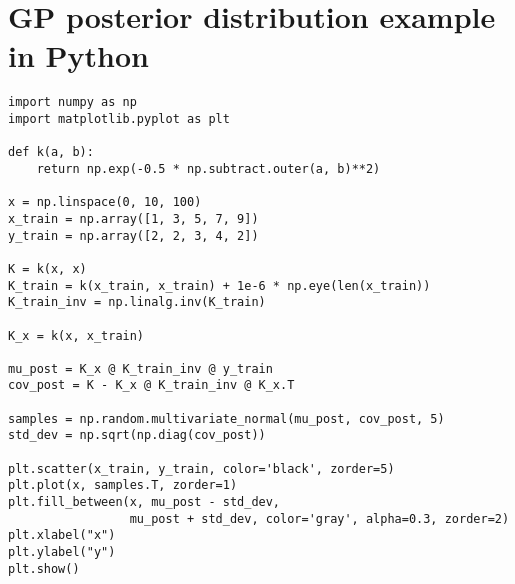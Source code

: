 \chapter{GP posterior distribution example in Python}
\label{att:gp-post-graph}
\begin{Verbatim}[tabsize=4]
import numpy as np
import matplotlib.pyplot as plt

def k(a, b):
	return np.exp(-0.5 * np.subtract.outer(a, b)**2)

x = np.linspace(0, 10, 100)
x_train = np.array([1, 3, 5, 7, 9])
y_train = np.array([2, 2, 3, 4, 2])

K = k(x, x)
K_train = k(x_train, x_train) + 1e-6 * np.eye(len(x_train))
K_train_inv = np.linalg.inv(K_train)

K_x = k(x, x_train)

mu_post = K_x @ K_train_inv @ y_train
cov_post = K - K_x @ K_train_inv @ K_x.T

samples = np.random.multivariate_normal(mu_post, cov_post, 5)
std_dev = np.sqrt(np.diag(cov_post))

plt.scatter(x_train, y_train, color='black', zorder=5)
plt.plot(x, samples.T, zorder=1)
plt.fill_between(x, mu_post - std_dev, 
				 mu_post + std_dev, color='gray', alpha=0.3, zorder=2)
plt.xlabel("x")
plt.ylabel("y")
plt.show()
\end{Verbatim}